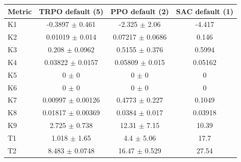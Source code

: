 \begin{tabular}{lccc}
\toprule
Metric & TRPO default (5) & PPO default (2) & SAC default (1) \\
\midrule
K1 & -0.3897 $\pm$ 0.461 & -2.325 $\pm$ 2.06 & -4.417 \\
K2 & 0.01019 $\pm$ 0.014 & 0.07217 $\pm$ 0.0686 & 0.146 \\
K3 & 0.208 $\pm$ 0.0962 & 0.5155 $\pm$ 0.376 & 0.5994 \\
K4 & 0.03822 $\pm$ 0.0157 & 0.05809 $\pm$ 0.015 & 0.05162 \\
K5 & 0 $\pm$ 0 & 0 $\pm$ 0 & 0 \\
K6 & 0 $\pm$ 0 & 0 $\pm$ 0 & 0 \\
K7 & 0.00997 $\pm$ 0.00126 & 0.4773 $\pm$ 0.227 & 0.1049 \\
K8 & 0.01817 $\pm$ 0.00369 & 0.0384 $\pm$ 0.017 & 0.03918 \\
K9 & 2.725 $\pm$ 0.738 & 12.31 $\pm$ 7.15 & 10.39 \\
T1 & 1.018 $\pm$ 1.65 & 4.4 $\pm$ 5.06 & 17.7 \\
T2 & 8.483 $\pm$ 0.0748 & 16.47 $\pm$ 0.529 & 27.54 \\
\bottomrule
\end{tabular}

